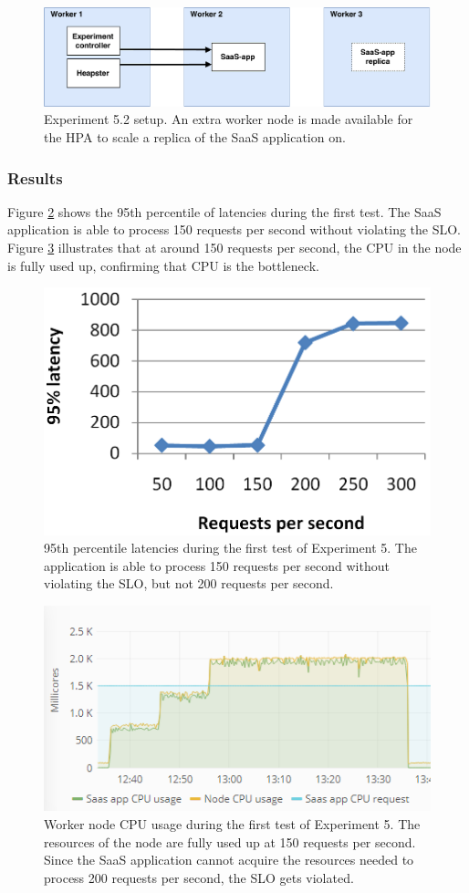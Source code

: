 \begin{figure}
\centering
\includegraphics[width=0.9\columnwidth]{Images/Experiments/Experiment_3_SaaS.pdf}
\caption{Experiment 5.2 setup. An extra worker node is made available for the HPA to scale a replica of the SaaS application on.}
\label{fig:experiment5.2}
\end{figure}


\subsubsection{Results}
Figure \ref{fig:lat-saas-li} shows the 95th percentile of latencies during the first test. The SaaS application is able to process 150 requests per second without violating the SLO. Figure \ref{fig:cpu-saas-li} illustrates that at around 150 requests per second, the CPU in the node is fully used up, confirming that CPU is the bottleneck. 

\begin{figure}
\centering
\includegraphics[width=0.50\columnwidth]{Images/Experiments/CPU/Latencies/lat-saas-li.PNG}
\caption{95th percentile latencies during the first test of Experiment 5. The application is able to process 150 requests per second without violating the SLO, but not 200 requests per second.}
\label{fig:lat-saas-li}
\end{figure}

\begin{figure}
\centering
\includegraphics[width=0.75\columnwidth]{Images/Experiments/CPU/Grafana/cpu-saas-li.PNG}
\caption{Worker node CPU usage during the first test of Experiment 5. The resources of the node are fully used up at 150 requests per second. Since the SaaS application cannot acquire the resources needed to process 200 requests per second, the SLO gets violated.}
\label{fig:cpu-saas-li}
\end{figure}

